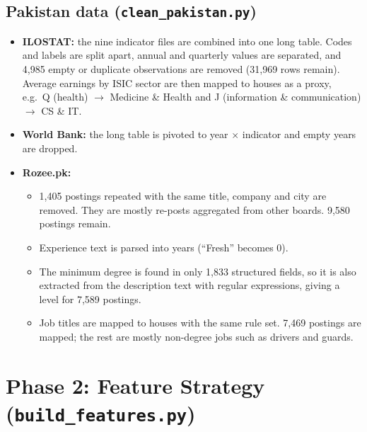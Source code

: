 \documentclass[11pt,a4paper]{article}
\begin{document}
\subsection{Pakistan data (\texttt{clean\_pakistan.py})}
\begin{itemize}
\item \textbf{ILOSTAT:} the nine indicator files are combined into one long table. Codes and labels
      are split apart, annual and quarterly values are separated, and 4,985 empty or duplicate
      observations are removed (31,969 rows remain). Average earnings by ISIC sector are then
      mapped to houses as a proxy, e.g.\ Q (health) $\rightarrow$ Medicine \& Health and
      J (information \& communication) $\rightarrow$ CS \& IT.
\item \textbf{World Bank:} the long table is pivoted to year $\times$ indicator and empty years are
      dropped.
\item \textbf{Rozee.pk:}
  \begin{itemize}
  \item 1,405 postings repeated with the same title, company and city are removed. They are mostly
        re-posts aggregated from other boards. 9,580 postings remain.
  \item Experience text is parsed into years (``Fresh'' becomes 0).
  \item The minimum degree is found in only 1,833 structured fields, so it is also extracted from
        the description text with regular expressions, giving a level for 7,589 postings.
  \item Job titles are mapped to houses with the same rule set. 7,469 postings are mapped; the
        rest are mostly non-degree jobs such as drivers and guards.
  \end{itemize}
\end{itemize}

\section{Phase 2: Feature Strategy (\texttt{build\_features.py})}
\end{document}
